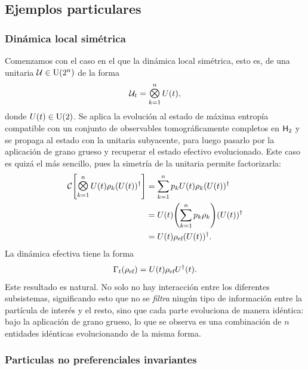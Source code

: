 \subsection{Ejemplos particulares}

\subsubsection{Dinámica local simétrica}

Comenzamos con el caso en el que la dinámica local simétrica, esto es, de una unitaria $\mathcal{U}\in\text{U}(2^{n})$ de la forma
\begin{equation}
    \mcU_{t}=\Motimes_{k=1}^{n}U(t),\nonumber
\end{equation}
donde $U(t)\in\text{U}(2)$. Se aplica la evolución al estado de máxima entropía compatible con un conjunto de observables tomográficamente completos en ${\sf H}_{2}$ y se propaga al estado con la unitaria subyacente, para luego pasarlo por la aplicación de grano grueso y recuperar el estado efectivo evolucionado. Este caso es quizá el más sencillo, pues la simetría de la unitaria permite factorizarla:
\begin{align}
\mcC\qty[\Motimes_{k=1}^{n}U(t) \rho_{k} (U(t))^{\dag}]&=\sum_{k=1}^{n}p_{k} U(t) \rho_{k} (U(t))^{\dag}\nonumber \\
&=U(t)\qty(\sum_{k=1}^{n}p_{k} \rho_{k}) (U(t))^{\dag}\nonumber\\
&=U(t)\rho_{\ef}(U(t))^{\dag}.\nonumber
\end{align}
La dinámica efectiva tiene la forma
\begin{equation}\label{eq:EffectiveSymmetricLocal}
    \Gamma_{t}(\rho_{\text{ef}})=U(t)\rho_{\text{ef}}U^\dag(t).
\end{equation}
Este resultado es natural. No solo no hay interacción entre los diferentes subsistemas, significando esto que no se \textit{filtra} ningún tipo de información entre la partícula de interés y el resto, sino que cada parte evoluciona de manera idéntica: bajo la aplicación de grano grueso, lo que se observa es una combinación de $n$ entidades idénticas evolucionando de la misma forma.

\subsubsection{Particulas no preferenciales invariantes}

